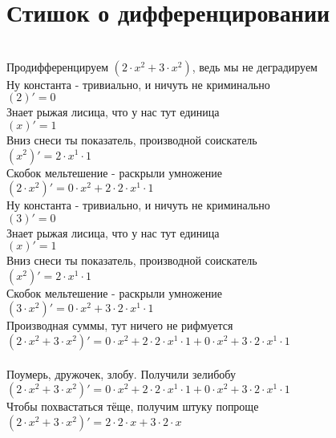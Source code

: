 \documentclass[a4paper,12pt]{article}
\begin{document}
\section*{Стишок о дифференцировании}\\
Продифференцируем $(2 \cdot x ^{2}  + 3 \cdot x ^{2} )$, ведь мы не деградируем\\
Ну константа - тривиально, и ничуть не криминально\\
\begin{math}
	(2)' = 0
\end{math}\\
Знает рыжая лисица, что у нас тут единица\\
\begin{math}
	(x)' = 1
\end{math}\\
Вниз снеси ты показатель, производной соискатель\\
\begin{math}
	(x ^{2} )' = 2 \cdot x ^{1}  \cdot 1
\end{math}\\
Скобок мельтешение - раскрыли умножение\\
\begin{math}
	(2 \cdot x ^{2} )' = 0 \cdot x ^{2}  + 2 \cdot 2 \cdot x ^{1}  \cdot 1
\end{math}\\
Ну константа - тривиально, и ничуть не криминально\\
\begin{math}
	(3)' = 0
\end{math}\\
Знает рыжая лисица, что у нас тут единица\\
\begin{math}
	(x)' = 1
\end{math}\\
Вниз снеси ты показатель, производной соискатель\\
\begin{math}
	(x ^{2} )' = 2 \cdot x ^{1}  \cdot 1
\end{math}\\
Скобок мельтешение - раскрыли умножение\\
\begin{math}
	(3 \cdot x ^{2} )' = 0 \cdot x ^{2}  + 3 \cdot 2 \cdot x ^{1}  \cdot 1
\end{math}\\
Производная суммы, тут ничего не рифмуется\\
\begin{math}
	(2 \cdot x ^{2}  + 3 \cdot x ^{2} )' = 0 \cdot x ^{2}  + 2 \cdot 2 \cdot x ^{1}  \cdot 1 + 0 \cdot x ^{2}  + 3 \cdot 2 \cdot x ^{1}  \cdot 1
\end{math}\\
\\Поумерь, дружочек, злобу. Получили зелибобу\\ $(2 \cdot x ^{2}  + 3 \cdot x ^{2} )' = 0 \cdot x ^{2}  + 2 \cdot 2 \cdot x ^{1}  \cdot 1 + 0 \cdot x ^{2}  + 3 \cdot 2 \cdot x ^{1}  \cdot 1$\\
Чтобы похвастаться тёще, получим штуку попроще\\
$(2 \cdot x ^{2}  + 3 \cdot x ^{2} )' = 2 \cdot 2 \cdot x + 3 \cdot 2 \cdot x$\\
\end{document}
